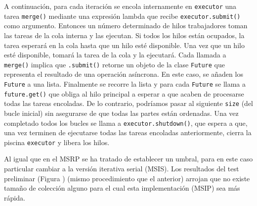 \documentclass[titlepage]{article}
\begin{document}
A continuación, para cada iteración se encola internamente en \lstinline{executor} una tarea \lstinline{merge()} mediante una expresión lambda que recibe \lstinline{executor.submit()} como argumento. Entonces un número determinado de hilos trabajadores toman las tareas de la cola interna y las ejecutan. Si todos los hilos están ocupados, la tarea esperará en la cola hasta que un hilo esté disponible. Una vez que un hilo esté disponible, tomará la tarea de la cola y la ejecutará. Cada llamada a \lstinline{merge()} implica que \lstinline{.submit()} retorne un objeto de la clase \lstinline{Future} que representa el resultado de una operación asíncrona. En este caso, se añaden los \lstinline{Future} a una lista. Finalmente se recorre la lista y para cada \lstinline{Future} se llama a \lstinline{future.get()} que obliga al hilo principal a esperar a que acaben de procesarse todas las tareas encoladas. De lo contrario, podríamos pasar al siguiente \lstinline{size} (del bucle inicial) sin asegurarse de que todas las partes están ordenadas. Una vez completado todos los bucles se llama a \lstinline{executor.shutdown()}, que espera a que, una vez terminen de ejecutarse todas las tareas encoladas anteriormente, cierra la piscina \lstinline{executor} y libera los hilos.

Al igual que en el MSRP se ha tratado de establecer un umbral, para en este caso particular cambiar a la versión iterativa serial (MSIS). Los resultados del test preliminar (Figura ) (mismo procedimiento que el anterior) arrojan que no existe tamaño de colección alguno para el cual esta implementación (MSIP) sea más rápida.
\end{document}
